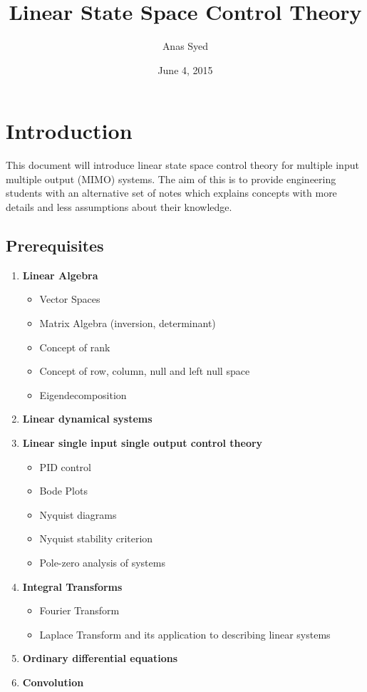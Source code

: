 \documentclass[a4paper,12pt]{article}
\title{Linear State Space Control Theory}
\date{June 4, 2015}
\author{Anas Syed}
\begin{document}
\maketitle
\tableofcontents
\newpage
\section{Introduction}
This document will introduce linear state space control theory for multiple input multiple output (MIMO) systems. The aim of this is to provide engineering students with an alternative set of notes which explains concepts with more details and less assumptions about their knowledge.
\subsection{Prerequisites}
\begin{enumerate}
  \item \textbf{Linear Algebra}
    \begin{itemize}
      \item Vector Spaces
      \item Matrix Algebra (inversion, determinant)
      \item Concept of rank
      \item Concept of row, column, null and left null space
      \item Eigendecomposition
    \end{itemize}
  \item \textbf{Linear dynamical systems}
  \item \textbf{Linear single input single output control theory}
    \begin{itemize}
      \item PID control
      \item Bode Plots
      \item Nyquist diagrams
      \item Nyquist stability criterion
      \item Pole-zero analysis of systems
    \end{itemize}
  \item \textbf{Integral Transforms}
    \begin{itemize}
      \item Fourier Transform
      \item Laplace Transform and its application to describing linear systems
    \end{itemize}
  \item \textbf{Ordinary differential equations}
  \item \textbf{Convolution}
\end{enumerate}
\end{document}
